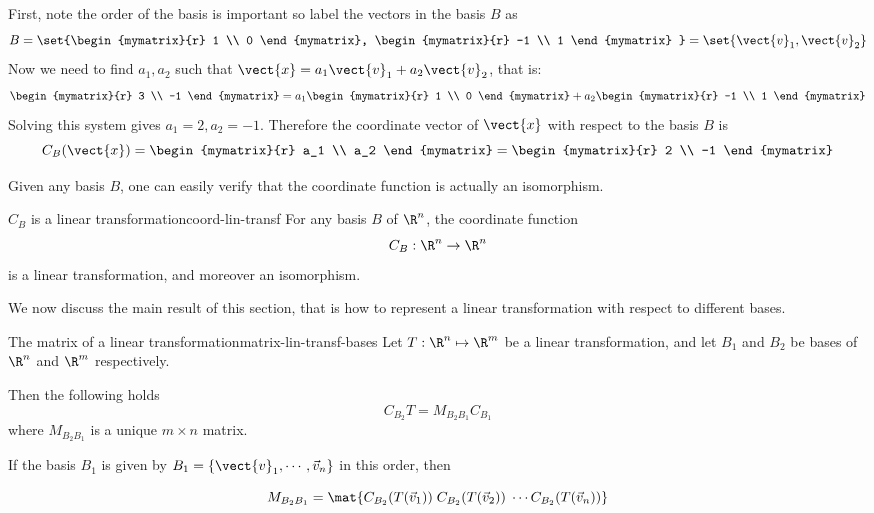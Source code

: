 \begin{solution}
First, note the order of the basis is important so label the vectors in the basis $B$ as 
\[
B = \set{\begin{mymatrix}{r}
1 \\
0 
\end{mymatrix}, \begin{mymatrix}{r}
-1 \\
1
\end{mymatrix} } = \set{\vect{v}_1, \vect{v}_2 } \]
Now we need to find $a_1, a_2$ such that $\vect{x} = a_1 \vect{v}_1 + a_2 \vect{v}_2$, that is:
\[
\begin{mymatrix}{r}
3 \\
-1
\end{mymatrix}
=
a_1 
\begin{mymatrix}{r}
1 \\
0 
\end{mymatrix}
+ a_2
\begin{mymatrix}{r}
-1 \\
1 
\end{mymatrix}\]
Solving this system gives $a_1 = 2, a_2 = -1$. Therefore the coordinate vector of $\vect{x}$ with respect to the basis $B$ is 
\[
C_B(\vect{x})
=
\begin{mymatrix}{r}
a_1 \\
a_2 
\end{mymatrix}
= \begin{mymatrix}{r}
2 \\
-1 
\end{mymatrix}
\]
\end{solution}

Given any basis $B$, one can easily verify that the coordinate function is actually an isomorphism. 

\begin{theorem}{$C_B$ is a linear transformation}{coord-lin-transf}
For any basis $B$ of $\R^n$, the coordinate function
\[ C_B: \R^n  \rightarrow \R^n  \]
is a linear transformation, and moreover an isomorphism. 
\end{theorem}

We now discuss the main  result  of this section, that is how
to represent a linear transformation with respect to different
bases.

\begin{theorem}{The matrix of a linear transformation}{matrix-lin-transf-bases}
Let $T: \R^n \mapsto \R^m$ be a linear transformation,
and let $B_1$ and $B_2$ be bases of $\R^{n}$ and
$\R^{m}$ respectively.

Then the following holds
\begin{equation}
C_{B_2} T = M_{B_{2} B_{1}} C_{B_1}   \label{matrix-equation}
\end{equation}
where $M_{B_{2} B_{1}}$  is a unique  $m \times n$  matrix.

If the basis $B_1$ is given by $B_1=\{\vect{v}_1, \cdots, \vec{v}_n\}$ in this order, then 

\[  M_{B_{2} B_{1}} = \mat{C_{B_2}(T(\vec{v}_1)) \; C_{B_2}(T(\vec{v}_2)) \; \cdots C_{B_2}(T(\vec{v}_n)) } \]
\end{theorem}

